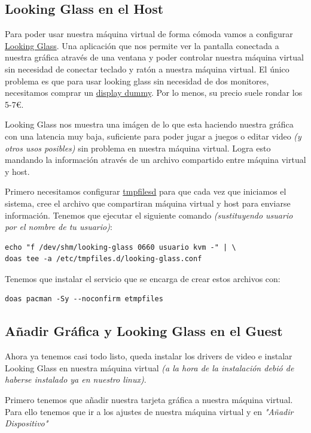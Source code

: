 \documentclass[12pt]{article}
\begin{document}
\subsection{Looking Glass en el Host}

Para poder usar nuestra máquina virtual de forma cómoda vamos a configurar \href{https://looking-glass.io/}{Looking Glass}. Una aplicación que nos permite ver la pantalla conectada a nuestra gráfica através de una ventana y poder controlar nuestra máquina virtual sin necesidad de conectar teclado y ratón a nuestra máquina virtual. El único problema es que para usar looking glass sin necesidad de dos monitores, necesitamos comprar un \href{https://www.amazon.com/s?k=display+dummy}{display dummy}. Por lo menos, su precio suele rondar los 5-7€.

Looking Glass nos muestra una imágen de lo que esta haciendo nuestra gráfica con una latencia muy baja, suficiente para poder jugar a juegos o editar video \emph{(y otros usos posibles)} sin problema en nuestra máquina virtual. Logra esto mandando la información através de un archivo compartido entre máquina virtual y host.

Primero necesitamos configurar \href{dsada}{tmpfilesd} para que cada vez que iniciamos el sistema, cree el archivo que compartiran máquina virtual y host para enviarse información. Tenemos que ejecutar el siguiente comando \emph{(sustituyendo usuario por el nombre de tu usuario)}:

\begin{verbatim}
echo "f /dev/shm/looking-glass 0660 usuario kvm -" | \
doas tee -a /etc/tmpfiles.d/looking-glass.conf
\end{verbatim}

Tenemos que instalar el servicio que se encarga de crear estos archivos con:

\begin{verbatim}
doas pacman -Sy --noconfirm etmpfiles
\end{verbatim}

\subsection{Añadir Gráfica y Looking Glass en el Guest}

Ahora ya tenemos casi todo listo, queda instalar los drivers de video e instalar Looking Glass en nuestra máquina virtual \emph{(a la hora de la instalación debió de haberse instalado ya en nuestro linux)}.

Primero tenemos que añadir nuestra tarjeta gráfica a nuestra máquina virtual. Para ello tenemos que ir a los ajustes de nuestra máquina virtual y en \emph{"Añadir Dispositivo"}
\end{document}
